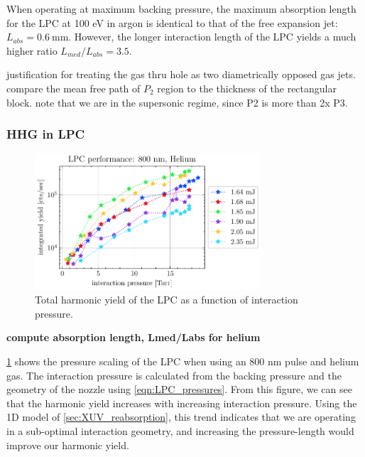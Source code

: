 When operating at maximum backing pressure, the maximum absorption length for the LPC at 100 eV in argon is identical to that of the free expansion jet: ${L_{abs} = 0.6 \ \textrm{mm}}$. However, the longer interaction length of the LPC yields a much higher ratio ${L_{med}/L_{abs} = 3.5}$.

justification for treating the gas thru hole as two diametrically opposed gas jets. compare the mean free path of $P_2$ region to the thickness of the rectangular block. note that we are in the supersonic regime, since P2 is more than 2x P3.

\subsubsection{HHG in LPC}

\begin{figure}
	\centering
	\includegraphics[width=0.75\textwidth]{figures/chap3/LPC_P_scaling_He800.pdf}
	\caption{Total harmonic yield of the LPC as a function of interaction pressure.}
	\label{fig:LPC_performance}
\end{figure}

\textbf{compute absorption length, Lmed/Labs for helium}





\cref{fig:LPC_performance} shows the pressure scaling of the LPC when using an 800 nm pulse and helium gas. The interaction pressure is calculated from the backing pressure and the geometry of the nozzle using \cref{eqn:LPC_pressures}. From this figure, we can see that the harmonic yield increases with increasing interaction pressure. Using the 1D model of \cref{sec:XUV_reabsorption}, this trend indicates that we are operating in a sub-optimal interaction geometry, and increasing the pressure-length would improve our harmonic yield.

